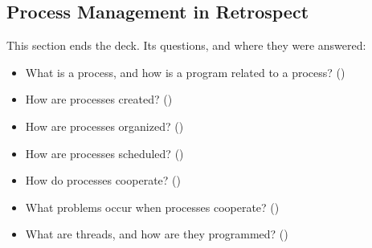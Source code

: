\subsection{Process Management in Retrospect}

This section ends the deck. Its questions, and where they were answered:
\begin{itemize}
  \item What is a process, and how is a program related to a process? ()
  \item How are processes created? ()
  \item How are processes organized? ()
  \item How are processes scheduled? ()
  \item How do processes cooperate? ()
  \item What problems occur when processes cooperate? ()
  \item What are threads, and how are they programmed? ()
\end{itemize}
